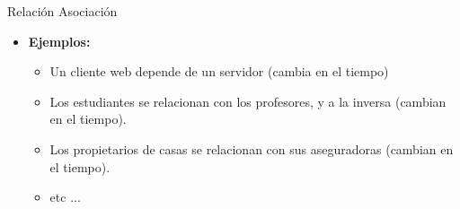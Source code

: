 \documentclass[10pt,envcountsect,spanish]{beamer}
\begin{document}
\begin{frame}[fragile]{Relación Asociación}
\

\begin{itemize}
\item \textbf{Ejemplos:} \it \small
\begin{itemize}
\item Un cliente web depende de un servidor (cambia en el tiempo)

\item Los estudiantes se relacionan con los profesores, y a la inversa (cambian en el tiempo).

\item Los propietarios de casas se relacionan con sus aseguradoras (cambian en el tiempo).

\item etc ...
\end{itemize}

\end{itemize}

\end{frame}
\end{document}
